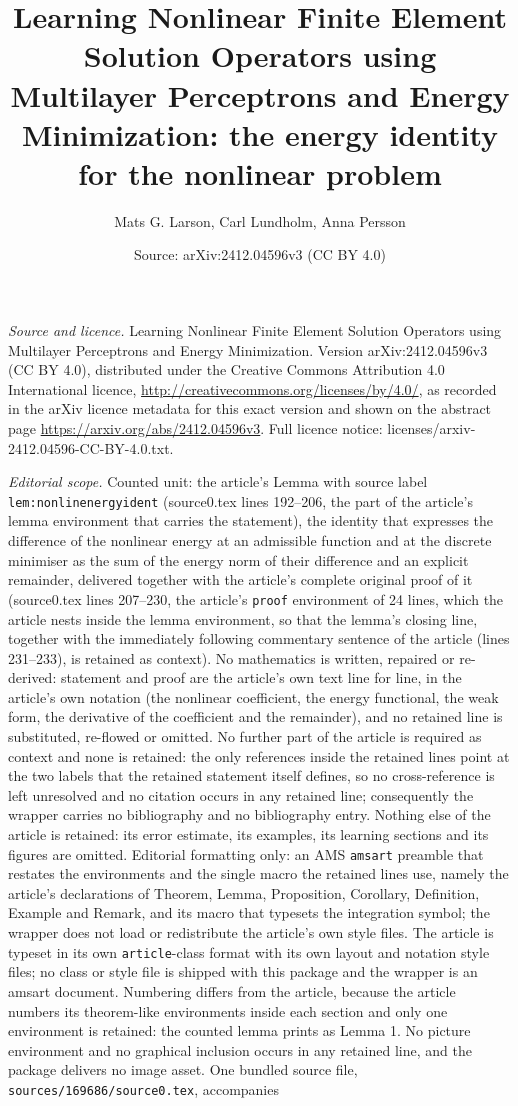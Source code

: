 \documentclass[10pt,a4paper]{amsart}
\title[Learned finite element solution operators]{Learning Nonlinear Finite Element Solution Operators using Multilayer Perceptrons and Energy Minimization: the energy identity for the nonlinear problem}
\author{Mats G. Larson, Carl Lundholm, Anna Persson}
\date{Source: arXiv:2412.04596v3 (CC BY 4.0)}
\theoremstyle{plain}
\theoremstyle{definition}
\theoremstyle{remark}
\begin{document}
\maketitle
\noindent\emph{Source and licence.} Learning Nonlinear Finite Element Solution Operators using Multilayer Perceptrons and Energy Minimization. Version arXiv:2412.04596v3 (CC BY 4.0), distributed under the Creative Commons Attribution 4.0 International licence, \url{http://creativecommons.org/licenses/by/4.0/}, as recorded in the arXiv licence metadata for this exact version and shown on the abstract page \url{https://arxiv.org/abs/2412.04596v3}. Full licence notice: licenses/arxiv-2412.04596-CC-BY-4.0.txt.\par\smallskip

\noindent\textit{Editorial scope.} Counted unit: the article's Lemma with source label \texttt{lem:nonlinenergyident} (source0.tex lines 192--206, the part of the article's lemma environment that carries the statement), the identity that expresses the difference of the nonlinear energy at an admissible function and at the discrete minimiser as the sum of the energy norm of their difference and an explicit remainder, delivered together with the article's complete original proof of it (source0.tex lines 207--230, the article's \texttt{proof} environment of 24 lines, which the article nests inside the lemma environment, so that the lemma's closing line, together with the immediately following commentary sentence of the article (lines 231--233), is retained as context). No mathematics is written, repaired or re-derived: statement and proof are the article's own text line for line, in the article's own notation (the nonlinear coefficient, the energy functional, the weak form, the derivative of the coefficient and the remainder), and no retained line is substituted, re-flowed or omitted. No further part of the article is required as context and none is retained: the only references inside the retained lines point at the two labels that the retained statement itself defines, so no cross-reference is left unresolved and no citation occurs in any retained line; consequently the wrapper carries no bibliography and no bibliography entry. Nothing else of the article is retained: its error estimate, its examples, its learning sections and its figures are omitted. Editorial formatting only: an AMS \texttt{amsart} preamble that restates the environments and the single macro the retained lines use, namely the article's declarations of Theorem, Lemma, Proposition, Corollary, Definition, Example and Remark, and its macro that typesets the integration symbol; the wrapper does not load or redistribute the article's own style files. The article is typeset in its own \texttt{article}-class format with its own layout and notation style files; no class or style file is shipped with this package and the wrapper is an amsart document. Numbering differs from the article, because the article numbers its theorem-like environments inside each section and only one environment is retained: the counted lemma prints as Lemma 1. No picture environment and no graphical inclusion occurs in any retained line, and the package delivers no image asset. One bundled source file, \texttt{sources/169686/source0.tex}, accompanies 
\end{document}
